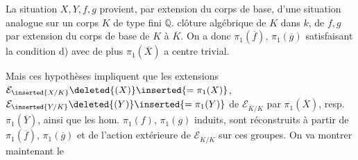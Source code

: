 
La situation $X,Y,f,g$ provient, par extension du corps de base, d'une situation analogue sur un corps $K$  de type fini  $\mathbb Q$.   clôture algébrique  de $K$ dans $k$,    de  $f,g$ par extension du corps de base de $K$ à $\overline K$. On a donc $\pi_1(\overline f)$, $\pi_1(\overline g)$ satisfaisant la condition d) avec de plus $\pi_1(\overline X)$ a centre trivial.

Mais ces hypothèses impliquent que les extensions $\mathcal E_{\inserted{X/K}}\deleted{(X)}\inserted{=\pi_1(X)}$, $\mathcal E_{\inserted{Y/K}}\deleted{(Y)}\inserted{=\pi_1(Y)}$ de $\mathcal E_{\overline K/K}$ par $\pi_1(\overline X)$, resp. $\pi_1(\overline Y)$, ainsi que les hom. $\pi_1(f)$, $\pi_1(g)$ induits, sont réconstruits à partir de  $\pi_1(\overline f)$, $\pi_1(\overline g)$ et de l'action extérieure de $\mathcal E_{\overline K/K}$ sur ces groupes. On va montrer maintenant le
